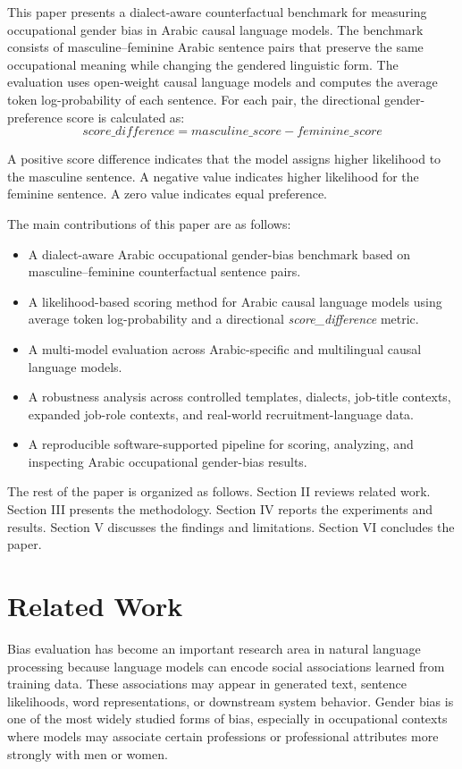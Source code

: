 \documentclass[conference]{IEEEtran}
\begin{document}
This paper presents a dialect-aware counterfactual benchmark for measuring occupational gender bias in Arabic causal language models. The benchmark consists of masculine--feminine Arabic sentence pairs that preserve the same occupational meaning while changing the gendered linguistic form. The evaluation uses open-weight causal language models and computes the average token log-probability of each sentence. For each pair, the directional gender-preference score is calculated as:
\begin{equation}
\textit{score\_difference} = \textit{masculine\_score} - \textit{feminine\_score}
\end{equation}

A positive score difference indicates that the model assigns higher likelihood to the masculine sentence. A negative value indicates higher likelihood for the feminine sentence. A zero value indicates equal preference.

The main contributions of this paper are as follows:
\begin{itemize}
    \item A dialect-aware Arabic occupational gender-bias benchmark based on masculine--feminine counterfactual sentence pairs.
    \item A likelihood-based scoring method for Arabic causal language models using average token log-probability and a directional \textit{score\_difference} metric.
    \item A multi-model evaluation across Arabic-specific and multilingual causal language models.
    \item A robustness analysis across controlled templates, dialects, job-title contexts, expanded job-role contexts, and real-world recruitment-language data.
    \item A reproducible software-supported pipeline for scoring, analyzing, and inspecting Arabic occupational gender-bias results.
\end{itemize}

The rest of the paper is organized as follows. Section II reviews related work. Section III presents the methodology. Section IV reports the experiments and results. Section V discusses the findings and limitations. Section VI concludes the paper.

\section{Related Work}

Bias evaluation has become an important research area in natural language processing because language models can encode social associations learned from training data. These associations may appear in generated text, sentence likelihoods, word representations, or downstream system behavior. Gender bias is one of the most widely studied forms of bias, especially in occupational contexts where models may associate certain professions or professional attributes more strongly with men or women.
\end{document}
